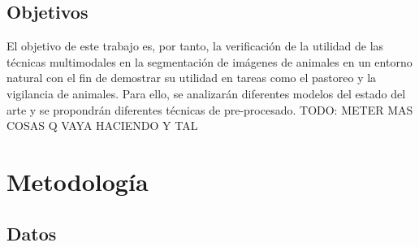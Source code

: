 \documentclass[12pt,a4paper]{report}
\begin{document}
\section{Objetivos}
\label{sec:objectives}
El objetivo de este trabajo es, por tanto, la verificación de la utilidad de las técnicas multimodales en la segmentación de imágenes de animales en un entorno natural con el fin de demostrar su utilidad en tareas como el pastoreo y la vigilancia de animales. Para ello, se analizarán diferentes modelos del estado del arte y se propondrán diferentes técnicas de pre-procesado.
TODO: METER MAS COSAS Q VAYA HACIENDO Y TAL

\chapter{Metodología}
\label{chap:methodology}
\section{Datos}
\label{sec:data}
\end{document}
